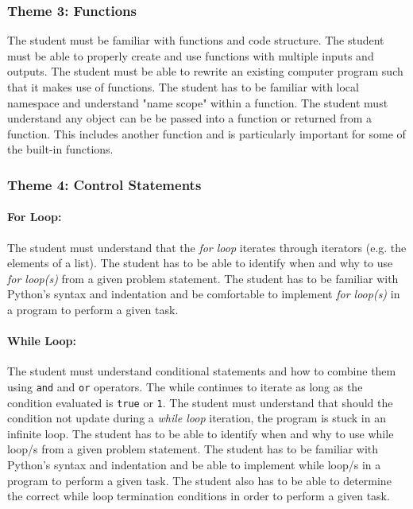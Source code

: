         \subsubsection{Theme 3: Functions}
            The student must be familiar with functions and code structure.
            The student must be able to properly create and use functions with
            multiple inputs and outputs. The student must be able to rewrite an
            existing computer program such that it makes use of functions. The
            student has to be familiar with local namespace and understand
            "name scope" within a function. The student must understand any
            object can be be passed into a function or returned from a
            function. This includes another function and is particularly
            important for some of the built-in functions.

        \subsubsection{Theme 4: Control Statements}
            \paragraph{For Loop:}
                The student must understand that the \textit{for loop} iterates
                through iterators (e.g. the elements of a list). The student
                has to be able to identify when and why to use \textit{for
                loop(s)} from a given problem statement. The student has to be
                familiar with Python's syntax and indentation and be
                comfortable to implement \textit{for loop(s)} in a program to
                perform a given task.

            \paragraph{While Loop:}
                The student must understand conditional statements and how to
                combine them using \texttt{and} and \texttt{or} operators. The
                while continues to iterate as long as the condition evaluated
                is \texttt{true} or \texttt{1}. The student must understand
                that should the condition not update during a \textit{while
                loop} iteration, the program is stuck in an infinite loop. The
                student has to be able to identify when and why to use while
                loop/s from a given problem statement. The student has to be
                familiar with Python's syntax and indentation and be able to
                implement while loop/s in a program to perform a given task.
                The student also has to be able to determine the correct while
                loop termination conditions in order to perform a given task.

